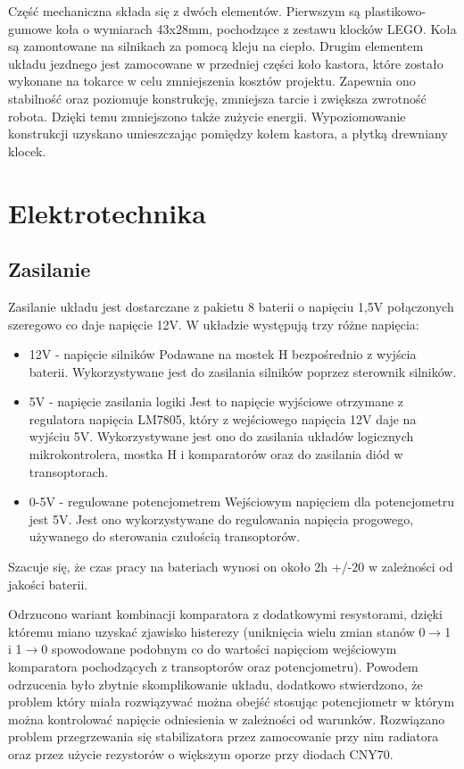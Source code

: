 \documentclass[11pt,a4paper]{article}
\begin{document}
  Część mechaniczna składa się z dwóch elementów. Pierwszym są plastikowo-gumowe koła o wymiarach 43x28mm, pochodzące z zestawu klocków LEGO. Koła są zamontowane na silnikach za pomocą kleju na ciepło.
Drugim elementem układu jezdnego jest zamocowane w przedniej części koło kastora, które zostało wykonane na tokarce w celu zmniejszenia kosztów projektu. Zapewnia ono stabilność oraz poziomuje konstrukcję, zmniejsza tarcie i zwiększa zwrotność robota. Dzięki temu zmniejszono także zużycie energii. Wypoziomowanie konstrukcji uzyskano umieszczając pomiędzy kołem kastora, a płytką drewniany klocek.

\section{Elektrotechnika}
\subsection{Zasilanie}
Zasilanie układu jest dostarczane z pakietu 8 baterii o napięciu 1,5V połączonych szeregowo co daje napięcie 12V.
 W układzie występują trzy różne napięcia:
  \begin{itemize} 
  \item 12V - napięcie silników
  Podawane na mostek H bezpośrednio z wyjścia baterii.
  Wykorzystywane jest do zasilania silników poprzez sterownik silników.
  \item 5V - napięcie zasilania logiki
  Jest to napięcie wyjściowe otrzymane z regulatora napięcia LM7805, który z wejściowego napięcia 12V daje na wyjściu 5V.
  Wykorzystywane jest ono do zasilania układów logicznych mikrokontrolera, mostka H i komparatorów oraz do zasilania diód w transoptorach.
  \item 0-5V - regulowane potencjometrem
  Wejściowym napięciem dla potencjometru jest 5V. Jest ono wykorzystywane do regulowania napięcia progowego, używanego do sterowania czułością transoptorów.
  \end{itemize}
  Szacuje się, że czas pracy na bateriach wynosi on około 2h +/-20 w zależności od jakości baterii.

  Odrzucono wariant kombinacji komparatora z dodatkowymi resystorami, dzięki któremu miano uzyskać zjawisko histerezy (uniknięcia wielu zmian stanów 0$\rightarrow$1 i 1$\rightarrow$0 spowodowane podobnym co do wartości napięciom wejściowym komparatora pochodzących z transoptorów oraz potencjometru).
  Powodem odrzucenia było zbytnie skomplikowanie układu, dodatkowo stwierdzono, że problem który miała rozwiązywać można obejść stosując potencjiometr w którym można kontrolować napięcie odniesienia w zależności od warunków.
  Rozwiązano problem przegrzewania się stabilizatora przez zamocowanie przy nim radiatora oraz przez użycie rezystorów o większym oporze przy diodach CNY70.
\end{document}

